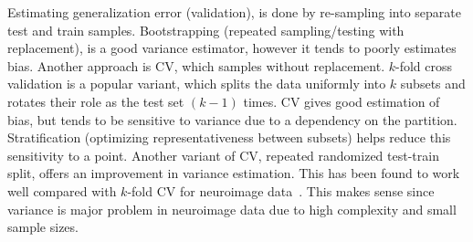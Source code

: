 Estimating generalization error (validation), is done by re-sampling into separate test and train samples. Bootstrapping (repeated sampling/testing with replacement), is a good variance estimator, however it tends to poorly estimates bias. Another approach is CV, which samples without replacement. $k$-fold cross validation is a popular variant, which splits the data uniformly into $k$ subsets and rotates their role as the test set $(k-1)$ times. CV gives good estimation of bias, but tends to be sensitive to variance due to a dependency on the partition. Stratification (optimizing representativeness between subsets) helps reduce this sensitivity to a point. Another variant of CV, repeated randomized test-train split, offers an improvement in variance estimation. This has been found to work well compared with $k$-fold CV for neuroimage data~\cite{varoquaux2017assessing}. This makes sense since variance is major problem in neuroimage data due to high complexity and small sample sizes. 

